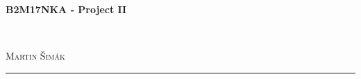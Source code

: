 \documentclass[11pt,a4paper]{article}
\begin{document}

    \begin{center}
        {\LARGE\textbf{B2M17NKA - Project II}}\\[3mm]
        \begin{minipage}{0.4\textwidth}
            \begin{flushleft}
                \textsc{}
            \end{flushleft}
        \end{minipage}
        ~
        \begin{minipage}{0.4\textwidth}
            \begin{flushright}
                \textsc{Martin Šimák}
            \end{flushright}
        \end{minipage}
        \noindent\rule{14.5cm}{0.4pt}
    \end{center}
\end{document}
